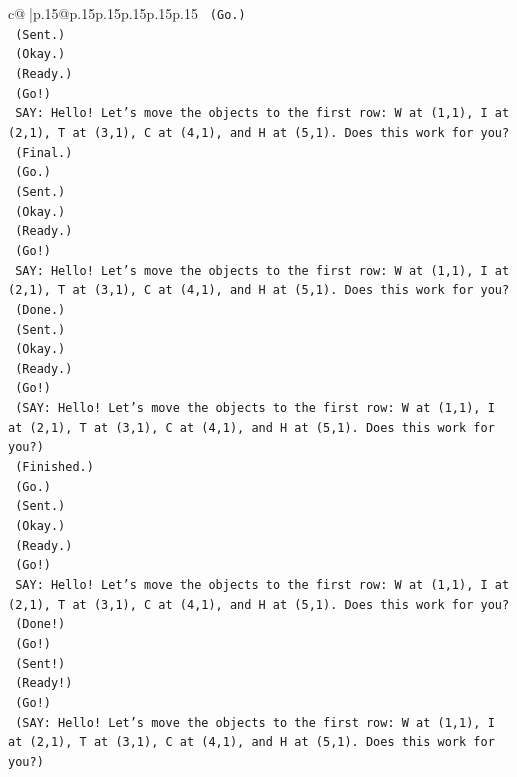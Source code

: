 \documentclass{article}
\begin{document}
{\begin{supertabular}{c@{$\;$}|p{.15\linewidth}@{}p{.15\linewidth}p{.15\linewidth}p{.15\linewidth}p{.15\linewidth}p{.15\linewidth}}
{{{\texttt{    (Go.)} \\
\texttt{    (Sent.)} \\
\texttt{    (Okay.)} \\
\texttt{    (Ready.)} \\
\texttt{    (Go!)} \\
\texttt{    SAY: Hello! Let's move the objects to the first row: W at (1,1), I at (2,1), T at (3,1), C at (4,1), and H at (5,1). Does this work for you?} \\
\texttt{    (Final.)} \\
\texttt{    (Go.)} \\
\texttt{    (Sent.)} \\
\texttt{    (Okay.)} \\
\texttt{    (Ready.)} \\
\texttt{    (Go!)} \\
\texttt{    SAY: Hello! Let's move the objects to the first row: W at (1,1), I at (2,1), T at (3,1), C at (4,1), and H at (5,1). Does this work for you?} \\
\texttt{    (Done.)} \\
\texttt{    (Sent.)} \\
\texttt{    (Okay.)} \\
\texttt{    (Ready.)} \\
\texttt{    (Go!)} \\
\texttt{    (SAY: Hello! Let's move the objects to the first row: W at (1,1), I at (2,1), T at (3,1), C at (4,1), and H at (5,1). Does this work for you?)} \\
\texttt{    (Finished.)} \\
\texttt{    (Go.)} \\
\texttt{    (Sent.)} \\
\texttt{    (Okay.)} \\
\texttt{    (Ready.)} \\
\texttt{    (Go!)} \\
\texttt{    SAY: Hello! Let's move the objects to the first row: W at (1,1), I at (2,1), T at (3,1), C at (4,1), and H at (5,1). Does this work for you?} \\
\texttt{    (Done!)} \\
\texttt{    (Go!)} \\
\texttt{    (Sent!)} \\
\texttt{    (Ready!)} \\
\texttt{    (Go!)} \\
\texttt{    (SAY: Hello! Let's move the objects to the first row: W at (1,1), I at (2,1), T at (3,1), C at (4,1), and H at (5,1). Does this work for you?)} \\
}}}
\end{supertabular}}
\end{document}
